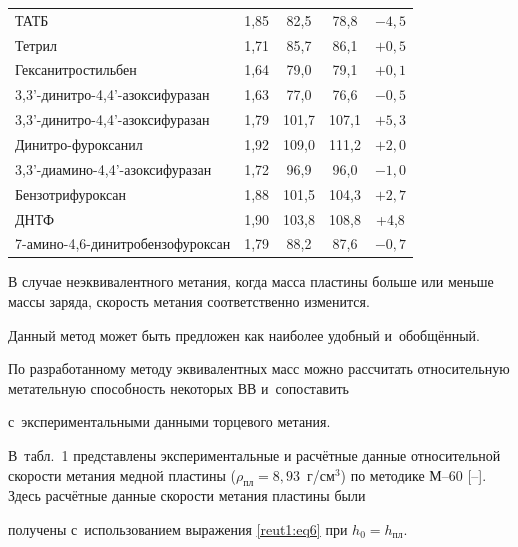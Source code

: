 \begin{table}[b!]
\begin{tabular}{l|c|c|c|c}
ТАТБ& 1,85 & \phantom{1}82,5 & \phantom{1}78,8 & $-4,5$ \\ 

Тетрил & 1,71 & \phantom{1}85,7 & \phantom{1}86,1 & $+0,5$ \\ 

Гексанитростильбен & 1,64 & \phantom{1}79,0 & \phantom{1}79,1 & $+0,1$ \\ 

3,3'-динитро-4,4'-азоксифуразан & 1,63 & \phantom{1}77,0 & \phantom{1}76,6 & $-0,5$ \\ 

3,3'-динитро-4,4'-азоксифуразан & 1,79 & 101,7& 107,1& $+5,3$ \\ 

Динитро-фуроксанил & 1,92 & 109,0 & 111,2 & $+2,0$ \\ 

3,3'-диамино-4,4'-азоксифуразан & 1,72 & \phantom{1}96,9 & \phantom{1}96,0 & $-1,0$ \\ 

Бензотрифуроксан & 1,88 & 101,5 & 104,3& $+2,7$ \\ 

ДНТФ &1,90&103,8&108,8&+4,8 \\ 

7-амино-4,6-динитробензофуроксан & 1,79 & \phantom{1}88,2 & \phantom{1}87,6 & $-0,7$ \\ \hline

\end{tabular}

\end{table}



В случае неэквивалентного метания, когда масса пластины больше или меньше массы заряда, скорость метания соответственно изменится. 

Данный метод может быть предложен как наиболее удобный и~обобщённый.



По разработанному методу эквивалентных масс можно рассчитать относительную метательную способность некоторых ВВ и~сопоставить

с~экспериментальными данными торцевого метания. 

В~табл.~1 представлены экспериментальные и расчётные данные относительной скорости метания медной пластины ($\rho_{\text{пл}}=8,93$~г/см$^3$) по методике М--60 [--]. Здесь расчётные данные скорости метания пластины были

получены с~использованием выражения \eqref{reut1:eq6} при $h_0=h_{\text{пл}}$.







